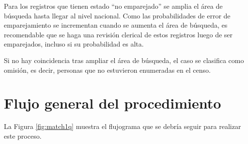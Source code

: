 \documentclass[
  12pt,
]{book}
\begin{document}
Para los registros que tienen estado ``no emparejado'' se amplia el área de búsqueda hasta llegar al nivel nacional. Como las probabilidades de error de emparejamiento se incrementan cuando se aumenta el área de búsqueda, es recomendable que se haga una revisión clerical de estos registros luego de ser emparejados, incluso si su probabilidad es alta.

Si no hay coincidencia tras ampliar el área de búsqueda, el caso se clasifica como omisión, es decir, personas que no estuvieron enumeradas en el censo.

\section{Flujo general del procedimiento}\label{flujo-general-del-procedimiento}

La Figura \ref{fig:match1q} muestra el flujograma que se debría seguir para realizar este proceso.
\end{document}
